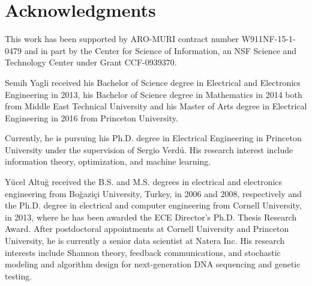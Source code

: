 \documentclass[journal, 10pt]{IEEEtran}
\theoremstyle{plain}
\theoremstyle{plain}
\theoremstyle{plain}
\theoremstyle{plain}
\begin{document}
\section*{Acknowledgments}
This work has been supported by ARO-MURI contract number W911NF-15-1-0479 and in part by the Center for Science of Information, an NSF Science and Technology Center under Grant CCF-0939370.




\begin{IEEEbiographynophoto}{Semih Yagli}
	received his Bachelor of Science degree in Electrical and Electronics Engineering in 2013, his Bachelor of Science degree in Mathematics in 2014 both from Middle East Technical University and his Master of Arts degree in Electrical Engineering in 2016 from Princeton University.
	
	Currently, he is pursuing his Ph.D. degree in Electrical Engineering in Princeton University under the supervision of Sergio Verd\'u. His research interest include information theory, optimization, and machine learning. 
\end{IEEEbiographynophoto}


\begin{IEEEbiographynophoto}{Y\"{u}cel Altu\u{g}} 
received the B.S. and M.S. degrees in electrical and electronics engineering from Bo\u{g}azi\c{c}i University, Turkey, in 2006 and 2008, respectively and the Ph.D. degree in electrical and computer engineering from Cornell University, in 2013, where he has been awarded the ECE Director's Ph.D. Thesis Research Award. After postdoctoral appointments at Cornell University and Princeton University, he is currently a senior data scientist at Natera Inc. His research interests include Shannon theory, feedback communications, and stochastic modeling and algorithm design for next-generation DNA sequencing and genetic testing.  	
\end{IEEEbiographynophoto}
\end{document}
